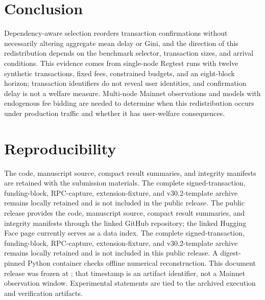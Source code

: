\documentclass[conference]{IEEEtran}
\begin{document}
\balance
\section{Conclusion}
Dependency-aware selection reorders transaction confirmations without necessarily altering aggregate mean delay or Gini, and the direction of this redistribution depends on the benchmark selector, transaction sizes, and arrival conditions. This evidence comes from single-node Regtest runs with twelve synthetic transactions, fixed fees, constrained budgets, and an eight-block horizon; transaction identifiers do not reveal user identities, and confirmation delay is not a welfare measure. Multi-node Mainnet observations and models with endogenous fee bidding are needed to determine when this redistribution occurs under production traffic and whether it has user-welfare consequences.

\section*{Reproducibility}
\ifdefined\AnonymousBuild
The code, manuscript source, compact result summaries, and integrity manifests are retained with the submission materials. The complete signed-transaction, funding-block, RPC-capture, extension-fixture, and v30.2-template archive remains locally retained and is not included in the public release.
\else
The public release provides the code, manuscript source, compact result summaries, and integrity manifests through the linked GitHub repository; the linked Hugging Face page currently serves as a data index. The complete signed-transaction, funding-block, RPC-capture, extension-fixture, and v30.2-template archive remains locally retained and is not included in this public release.
\fi
A digest-pinned Python container checks offline numerical reconstruction. This document release was frozen at \ReleaseTimestamp; that timestamp is an artifact identifier, not a Mainnet observation window. Experimental statements are tied to the archived execution and verification artifacts.



\end{document}
